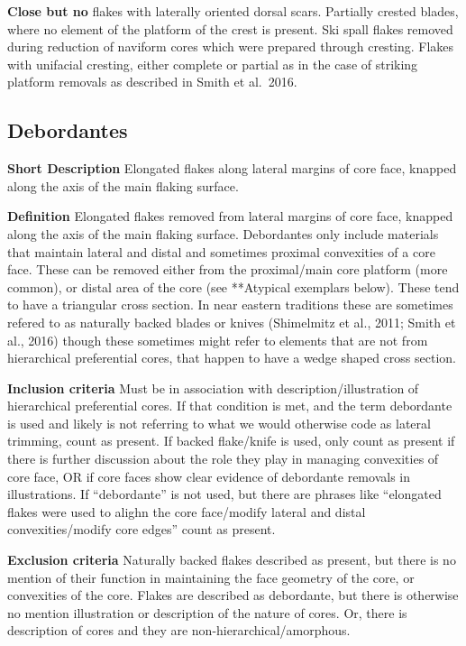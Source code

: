 \documentclass[
]{article}
\begin{document}
\textbf{Close but no} flakes with laterally oriented dorsal scars.
Partially crested blades, where no element of the platform of the crest
is present. Ski spall flakes removed during reduction of naviform cores
which were prepared through cresting. Flakes with unifacial cresting,
either complete or partial as in the case of striking platform removals
as described in Smith et al.~2016.

\hypertarget{debordantes}{%
\subsection{Debordantes}\label{debordantes}}

\textbf{Short Description} Elongated flakes along lateral margins of
core face, knapped along the axis of the main flaking surface.

\textbf{Definition} Elongated flakes removed from lateral margins of
core face, knapped along the axis of the main flaking surface.
Debordantes only include materials that maintain lateral and distal and
sometimes proximal convexities of a core face. These can be removed
either from the proximal/main core platform (more common), or distal
area of the core (see **Atypical exemplars below). These tend to have a
triangular cross section. In near eastern traditions these are sometimes
refered to as naturally backed blades or knives (Shimelmitz et al.,
2011; Smith et al., 2016) though these sometimes might refer to elements
that are not from hierarchical preferential cores, that happen to have a
wedge shaped cross section.

\textbf{Inclusion criteria} Must be in association with
description/illustration of hierarchical preferential cores. If that
condition is met, and the term debordante is used and likely is not
referring to what we would otherwise code as lateral trimming, count as
present. If backed flake/knife is used, only count as present if there
is further discussion about the role they play in managing convexities
of core face, OR if core faces show clear evidence of debordante
removals in illustrations. If ``debordante'' is not used, but there are
phrases like ``elongated flakes were used to alighn the core face/modify
lateral and distal convexities/modify core edges'' count as present.

\textbf{Exclusion criteria} Naturally backed flakes described as
present, but there is no mention of their function in maintaining the
face geometry of the core, or convexities of the core. Flakes are
described as debordante, but there is otherwise no mention illustration
or description of the nature of cores. Or, there is description of cores
and they are non-hierarchical/amorphous.
\end{document}
